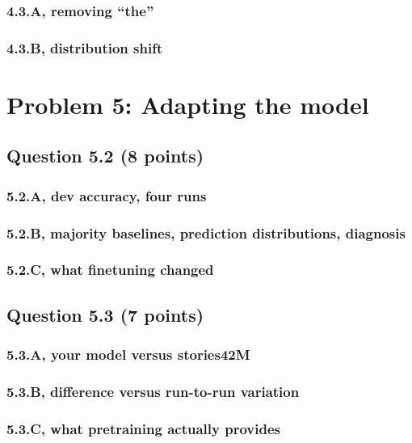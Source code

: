 \documentclass[11pt]{article}
\begin{document}
\subsubsection*{4.3.A, removing ``the''}
\subsubsection*{4.3.B, distribution shift}

\section*{Problem 5: Adapting the model}

\subsection*{Question 5.2 (8 points)}
\subsubsection*{5.2.A, dev accuracy, four runs}
\subsubsection*{5.2.B, majority baselines, prediction distributions, diagnosis}
\subsubsection*{5.2.C, what finetuning changed}

\subsection*{Question 5.3 (7 points)}
\subsubsection*{5.3.A, your model versus stories42M}
\subsubsection*{5.3.B, difference versus run-to-run variation}
\subsubsection*{5.3.C, what pretraining actually provides}
\end{document}
